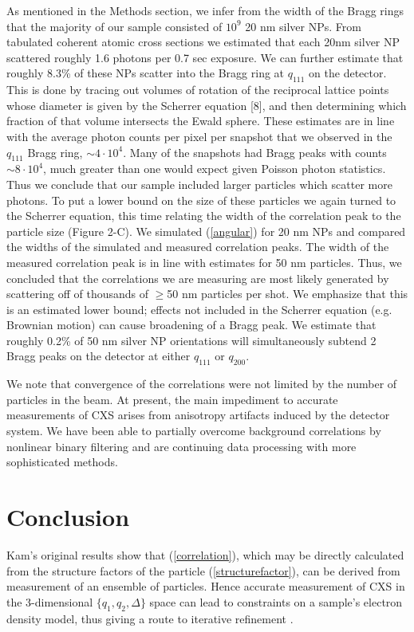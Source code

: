\documentclass [11pt,fleqn]{article}
\begin{document}
As mentioned in the Methods section, we infer from the width of the Bragg rings that the majority of our sample consisted of $10^9$ 20 nm silver NPs. From tabulated coherent atomic cross sections \cite{Henke:1993wx} we estimated that each 20nm silver NP scattered roughly 1.6 photons per 0.7 sec exposure. We can further estimate that roughly 8.3\% of these NPs scatter into the Bragg ring at $q_{111}$ on the detector. This is done by tracing out volumes of rotation of the reciprocal lattice points whose diameter is given by the Scherrer equation [8], and then determining which fraction of that volume intersects the Ewald sphere. These estimates are in line with the average photon counts per pixel per snapshot that we observed in the $q_{111}$ Bragg ring, $\sim 4 \cdot10^4$. Many of the snapshots had Bragg peaks with counts $\sim 8 \cdot10^4$, much greater than one would expect given Poisson photon statistics. Thus we conclude that our sample included larger particles which scatter more photons. To put a lower bound on the size of these particles we again turned to the Scherrer equation, this time relating the width of the correlation peak to the particle size (Figure 2-C). We simulated (\ref{angular}) for 20 nm NPs and compared the widths of the simulated and measured correlation peaks. The width of the measured correlation peak is in line with estimates for 50 nm particles. Thus, we concluded that the correlations we are measuring are most likely generated by scattering off of thousands of $\ge$50 nm particles per shot. We emphasize that this is an estimated lower bound; effects not included in the Scherrer equation (e.g. Brownian motion) can cause broadening of a Bragg peak. We estimate that roughly 0.2\% of 50 nm silver NP orientations will simultaneously subtend 2 Bragg peaks on the detector at either $q_{111}$ or $q_{200}$.

We note that convergence of the correlations were not limited by the number of particles in the beam.  At present, the main impediment to accurate measurements of CXS arises from anisotropy artifacts induced by the detector system.  We have been able to partially overcome background correlations by nonlinear binary filtering and are continuing data processing with more sophisticated methods.

\section{Conclusion}

Kam's original results \cite{Kam:1977wc} show that (\ref{correlation}), which may be directly calculated from the structure factors of the particle (\ref{structurefactor}), can be derived from measurement of an ensemble of particles. Hence accurate measurement of CXS in the 3-dimensional $\{q_1,q_2,\Delta\}$ space can lead to constraints on a sample's electron density model, thus giving a route to iterative refinement \cite{Schroder:2010cm}. 
\end{document}
